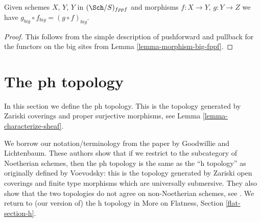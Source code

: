 \begin{lemma}
\label{lemma-composition-fppf}
Given schemes $X$, $Y$, $Y$ in $(\Sch/S)_{fppf}$
and morphisms $f : X \to Y$, $g : Y \to Z$ we have
$g_{big} \circ f_{big} = (g \circ f)_{big}$.
\end{lemma}

\begin{proof}
This follows from the simple description of pushforward
and pullback for the functors on the big sites from
Lemma \ref{lemma-morphism-big-fppf}.
\end{proof}



















































\section{The ph topology}
\label{section-ph}

\noindent
In this section we define the ph topology. This is the topology
generated by Zariski coverings and proper surjective morphisms, see
Lemma \ref{lemma-characterize-sheaf}.

\medskip\noindent
We borrow our notation/terminology
from the paper \cite{ph} by Goodwillie and Lichtenbaum.
These authors show that if we restrict to the subcategory of
Noetherian schemes, then the ph topology is the same as the
``h topology'' as originally defined by Voevodsky: this is
the topology generated by Zariski open coverings and
finite type morphisms which are universally submersive.
They also show that the two topologies do not agree on
non-Noetherian schemes, see \cite[Example 4.5]{ph}.
We return to (our version of) the h topology in
More on Flatness, Section \ref{flat-section-h}.

